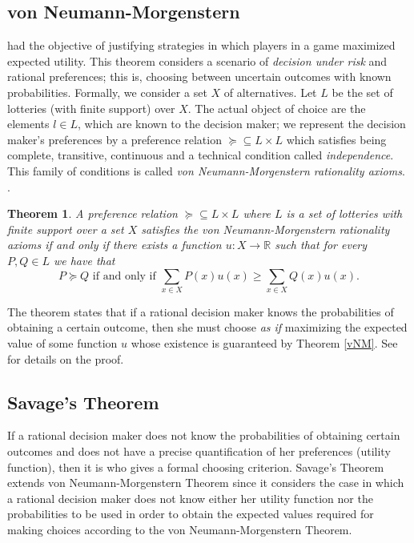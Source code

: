 \documentclass{article}
\theoremstyle{plain}
\newtheorem{teo}{Theorem}
\begin{document}
\subsection{von Neumann-Morgenstern}
\cite{von1944theory} had the objective of justifying strategies in which players in a game maximized expected utility. This theorem considers a scenario of \textit{decision under risk} and rational preferences; this is, choosing between uncertain outcomes with known probabilities. Formally, we consider a set $X$ of alternatives. Let $L$ be the set of lotteries (with finite support) over $X$. The actual object of choice are the elements $l \in L$, which are known to the decision maker; we represent the decision maker's preferences by a preference relation $\succeq \subseteq L \times L$ which satisfies being complete, transitive, continuous and a technical condition called \textit{independence}. This family of conditions is called \textit{von Neumann-Morgenstern rationality axioms}. \cite{gilboa2009decision}.
\begin{teo}{\label{vNM}}
A preference relation $\succeq \subseteq L \times L$ where $L$ is a set of lotteries with finite support over a set $X$ satisfies the von Neumann-Morgenstern rationality axioms if and only if there exists a function $u: X \to \mathbb{R}$ such that for every $P, Q \in L$ we have that
\begin{equation}
P \succeq Q \textrm{ if and only if } \sum_{x \in X} P(x) u(x) \geq \sum_{x \in X} Q(x) u(x). 
\end{equation}
\end{teo}
The theorem states that if a rational decision maker knows the probabilities of obtaining a certain outcome, then she must choose \textit{as if} maximizing the expected value of some function $u$ whose existence is guaranteed by Theorem \ref{vNM}. See \cite{gilboa2009decision} for details on the proof.
\subsection{Savage's Theorem}
If a rational decision maker does not know the probabilities of obtaining certain outcomes and does not have a precise quantification of her preferences (utility function), then it is \cite{savage1954the} who gives a formal choosing criterion. Savage's Theorem extends von Neumann-Morgenstern Theorem since it considers the case in which a rational decision maker does not know either her utility function nor the probabilities to be used in order to obtain the expected values required for making choices according to the von Neumann-Morgenstern Theorem.
\end{document}
